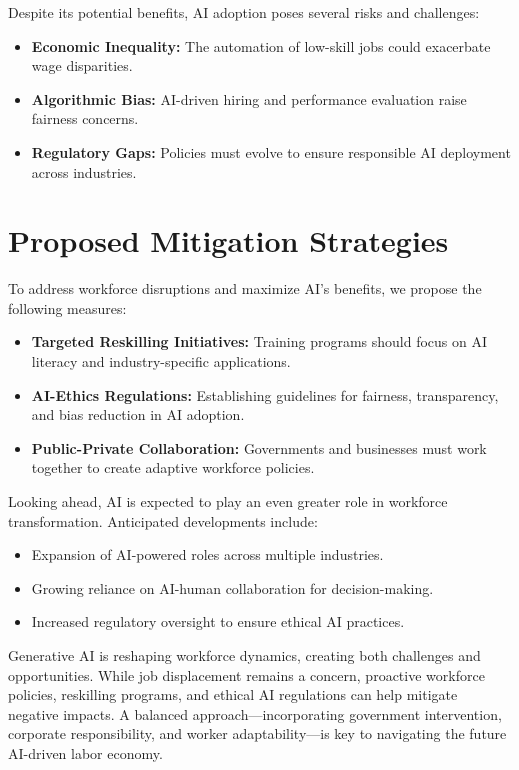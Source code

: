 \documentclass[a4paper,headinclude=on,footinclude=on,12pt,oneside]{scrbook}
\begin{document}

Despite its potential benefits, AI adoption poses several risks and challenges:
\begin{itemize}
	\item \textbf{Economic Inequality:} The automation of low-skill jobs could exacerbate wage disparities.
	\item \textbf{Algorithmic Bias:} AI-driven hiring and performance evaluation raise fairness concerns.
	\item \textbf{Regulatory Gaps:} Policies must evolve to ensure responsible AI deployment across industries.
\end{itemize}

\section{Proposed Mitigation Strategies}

To address workforce disruptions and maximize AI’s benefits, we propose the following measures:
\begin{itemize}
	\item \textbf{Targeted Reskilling Initiatives:} Training programs should focus on AI literacy and industry-specific applications.
	\item \textbf{AI-Ethics Regulations:} Establishing guidelines for fairness, transparency, and bias reduction in AI adoption.
	\item \textbf{Public-Private Collaboration:} Governments and businesses must work together to create adaptive workforce policies.
\end{itemize}


Looking ahead, AI is expected to play an even greater role in workforce transformation. Anticipated developments include:
\begin{itemize}
	\item Expansion of AI-powered roles across multiple industries.
	\item Growing reliance on AI-human collaboration for decision-making.
	\item Increased regulatory oversight to ensure ethical AI practices.
\end{itemize}


Generative AI is reshaping workforce dynamics, creating both challenges and opportunities. While job displacement remains a concern, proactive workforce policies, reskilling programs, and ethical AI regulations can help mitigate negative impacts. A balanced approach—incorporating government intervention, corporate responsibility, and worker adaptability—is key to navigating the future AI-driven labor economy.
\end{document}
